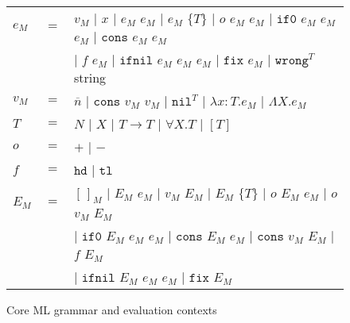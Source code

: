 \begin{figure}[ph!]
\centering
\begin{tabular}{lcl}
$e_{M}$ & $=$ & $v_{M}$ $\vert$ $x$ $\vert$ $e_{M}$ $e_{M}$ $\vert$ $e_{M}$ $\lbrace T\rbrace$ $\vert$ $o$ $e_{M}$ $e_{M}$ $\vert$ $\mathtt{if0}$ $e_{M}$ $e_{M}$ $e_{M}$ $\vert$ $\mathtt{cons}$ $e_{M}$ $e_{M}$ \\

\vspace{5pt}

&& $\vert$ $f$ $e_{M}$ $\vert$ $\mathtt{ifnil}$ $e_{M}$ $e_{M}$ $e_{M}$ $\vert$ $\mathtt{fix}$ $e_{M}$ $\vert$ $\mathtt{wrong}^{T}$ string \\

\vspace{5pt}

$v_{M}$ & $=$ & $\overline{n}$ $\vert$ $\mathtt{cons}$ $v_{M}$ $v_{M}$ $\vert$ $\mathtt{nil}^{T}$ $\vert$ $\lambda x:T.e_{M}$ $\vert$ $\Lambda X.e_{M}$ \\

\vspace{5pt}

$T$ & $=$ & $N$ $\vert$ $X$ $\vert$ $T\rightarrow T$ $\vert$ $\forall X.T$ $\vert$ $[T]$ \\

\vspace{5pt}

$o$ & $=$ & $\mathtt{+}$ $\vert$ $\mathtt{-}$ \\

\vspace{5pt}

$f$ & $=$ & $\mathtt{hd}$ $\vert$ $\mathtt{tl}$ \\

\vspace{5pt}

$E_{M}$ & $=$ & $[\,]_{M}$ $\vert$ $E_{M}$ $e_{M}$ $\vert$ $v_{M}$ $E_{M}$ $\vert$ $E_{M}$ $\lbrace T\rbrace$ $\vert$ $o$ $E_{M}$ $e_{M}$ $\vert$ $o$ $v_{M}$ $E_{M}$ \\

\vspace{5pt}

&& $\vert$ $\mathtt{if0}$ $E_{M}$ $e_{M}$ $e_{M}$ $\vert$ $\mathtt{cons}$ $E_{M}$ $e_{M}$ $\vert$ $\mathtt{cons}$ $v_{M}$ $E_{M}$ $\vert$ $f$ $E_{M}$ \\

\vspace{5pt}

&& $\vert$ $\mathtt{ifnil}$ $E_{M}$ $e_{M}$ $e_{M}$ $\vert$ $\mathtt{fix}$ $E_{M}$
\end{tabular}
\caption{Core ML grammar and evaluation contexts}
\label{mce}
\end{figure}